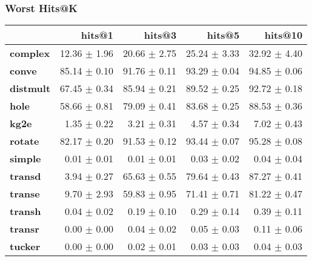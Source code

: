 \documentclass{article}
\begin{document}
    \subsubsection{Worst Hits@K}
    \begin{center}
    \begin{tabular}{lrrrr}
\toprule
{} &        hits@1 &        hits@3 &        hits@5 &       hits@10 \\
\midrule
\textbf{complex } &  12.36 $\pm$ 1.96 &  20.66 $\pm$ 2.75 &  25.24 $\pm$ 3.33 &  32.92 $\pm$ 4.40 \\
\textbf{conve   } &  85.14 $\pm$ 0.10 &  91.76 $\pm$ 0.11 &  93.29 $\pm$ 0.04 &  94.85 $\pm$ 0.06 \\
\textbf{distmult} &  67.45 $\pm$ 0.34 &  85.94 $\pm$ 0.21 &  89.52 $\pm$ 0.25 &  92.72 $\pm$ 0.18 \\
\textbf{hole    } &  58.66 $\pm$ 0.81 &  79.09 $\pm$ 0.41 &  83.68 $\pm$ 0.25 &  88.53 $\pm$ 0.36 \\
\textbf{kg2e    } &   1.35 $\pm$ 0.22 &   3.21 $\pm$ 0.31 &   4.57 $\pm$ 0.34 &   7.02 $\pm$ 0.43 \\
\textbf{rotate  } &  82.17 $\pm$ 0.20 &  91.53 $\pm$ 0.12 &  93.44 $\pm$ 0.07 &  95.28 $\pm$ 0.08 \\
\textbf{simple  } &   0.01 $\pm$ 0.01 &   0.01 $\pm$ 0.01 &   0.03 $\pm$ 0.02 &   0.04 $\pm$ 0.04 \\
\textbf{transd  } &   3.94 $\pm$ 0.27 &  65.63 $\pm$ 0.55 &  79.64 $\pm$ 0.43 &  87.27 $\pm$ 0.41 \\
\textbf{transe  } &   9.70 $\pm$ 2.93 &  59.83 $\pm$ 0.95 &  71.41 $\pm$ 0.71 &  81.22 $\pm$ 0.47 \\
\textbf{transh  } &   0.04 $\pm$ 0.02 &   0.19 $\pm$ 0.10 &   0.29 $\pm$ 0.14 &   0.39 $\pm$ 0.11 \\
\textbf{transr  } &   0.00 $\pm$ 0.00 &   0.04 $\pm$ 0.02 &   0.05 $\pm$ 0.03 &   0.11 $\pm$ 0.06 \\
\textbf{tucker  } &   0.00 $\pm$ 0.00 &   0.02 $\pm$ 0.01 &   0.03 $\pm$ 0.03 &   0.04 $\pm$ 0.03 \\
\bottomrule
\end{tabular}

    \end{center}
\end{document}
